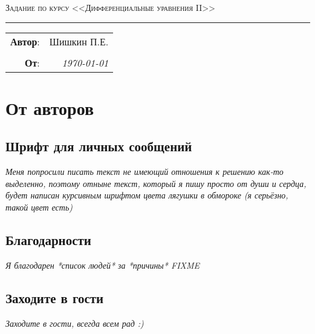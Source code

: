 \documentclass{article}
\begin{document}
\setlength{\abovedisplayskip}{3pt}
\setlength{\abovedisplayshortskip}{3pt}
\setlength{\belowdisplayskip}{3pt}
\setlength{\belowdisplayshortskip}{3pt}


\begin{center}
    \LARGE \textsc{Задание по курсу <<Дифференциальные уравнения II>>}
\end{center}

\hrule

\phantom{42}

\begin{flushright}
    \begin{tabular}{rr}
        \textbf{Автор}: 
        & Шишкин П.Е. \\ 
        &\\
        \textbf{От}: &
        \textit{\today}\\
    \end{tabular}
\end{flushright}

\thispagestyle{empty}
\tableofcontents 
\newpage


\section{От авторов}
\subsection{Шрифт для личных сообщений}
\textcolor[rgb]{0.480469, 0.566406, 0.480469}{\textit{Меня попросили писать текст не имеющий отношения к решению как-то выделенно, поэтому отныне текст, который я пишу просто от души и сердца, будет написан курсивным шрифтом цвета лягушки в обмороке (я серьёзно, такой цвет есть)}}
\subsection{Благодарности}                                            
\textcolor[rgb]{0.480469,0.566406,0.480469}{\textit{Я благодарен *список людей* за *причины* FIXME}}
\subsection{Заходите в гости}
 \textcolor[rgb]{0.480469,0.566406,0.480469}{\textit{Заходите в гости, всегда всем рад :)}}                                                                                              
\end{document}
